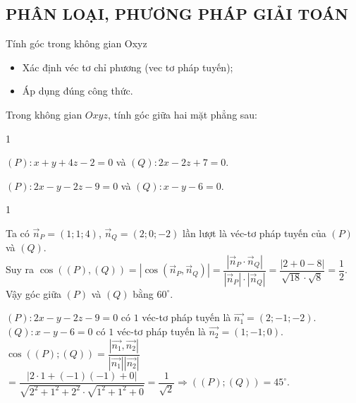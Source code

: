 \subsection{PHÂN LOẠI, PHƯƠNG PHÁP GIẢI TOÁN}
\begin{dang}{Tính góc trong không gian Oxyz}
	\begin{itemize}
		\item [$\bullet$] Xác định véc tơ chỉ phương (vec tơ pháp tuyến);
		\item [$\bullet$] Áp dụng đúng công thức.
	\end{itemize}
\end{dang}
\setcounter{vd}{0}
\begin{vd}
	Trong không gian $Oxyz$, tính góc giữa hai mặt phẳng sau:
	\begin{enumEX}[a)]{1}
		\item $(P)\colon x+y+4z-2=0$ và $(Q)\colon 2x-2z+7=0$.
		\item $(P)\colon 2x - y-2z-9=0$ và $(Q)\colon  x - y - 6=0$.
	\end{enumEX}
	\loigiai
	{
	\begin{enumEX}[a)]{1}
		\item Ta có $\vec{n}_P=(1;1;4)$, $\vec{n}_Q=(2;0;-2)$ lần lượt là véc-tơ pháp tuyến của $(P)$ và $(Q)$.\\
		Suy ra $\cos\left((P),(Q)\right)=|\cos\left(\vec{n}_P,\vec{n}_Q\right)|=\dfrac{|\vec{n}_P\cdot \vec{n}_Q|}{|\vec{n}_P|\cdot |\vec{n}_Q|}=\dfrac{|2+0-8|}{\sqrt{18}\cdot \sqrt{8}}=\dfrac{1}{2}$.\\
		Vậy góc giữa $(P)$ và $(Q)$ bằng $60^\circ$.
		\item $(P)\colon 2x - y-2z-9=0$ có $1$ véc-tơ pháp tuyến là $\overrightarrow{n_1} = (2;-1;-2)$.\\
		$(Q)\colon  x - y - 6=0$ có $1$ véc-tơ pháp tuyến là $\overrightarrow{n_2} = (1;-1;0)$.\\
		$\cos \left(\left( P \right);\left( Q \right)\right) = \dfrac{\left|\overrightarrow{n_1}, \overrightarrow{n_2}\right|}{\left|\overrightarrow{n_1}\right|\left|\overrightarrow{n_2}\right|} $
		$= \dfrac{\left|2\cdot 1 + \left(- 1\right)\left(- 1\right) + 0\right|}{\sqrt{2^2 + 1^2 + 2^2}\cdot \sqrt{1^2+ 1^2 + 0}}= \dfrac{1}{\sqrt{2}} \Rightarrow \left(\left( P \right);\left( Q \right)\right) = 45^\circ$.
	\end{enumEX}
	}
\end{vd}
